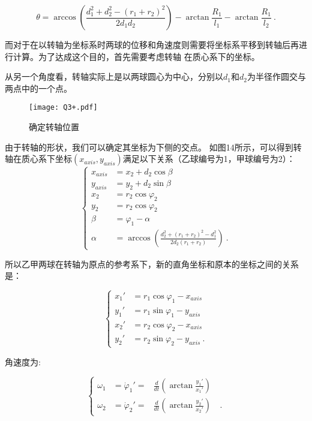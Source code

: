 \documentclass[a4paper,c5size,twoside,UTF8]{ctexart} %
\newcommand{\FS}[2]{\displaystyle\frac{#1}{#2}}
\numberwithin{equation}{section}   %
\begin{document}
\begin{equation}
	\theta= \arccos{\left(\FS{d_1^2+d_2^2-\left(r_1+r_2\right)^2}{2d_1d_2}\right)}-\arctan{\FS{R_1}{l_1}}-\arctan{\FS{R_1}{l_2}}~.
\end{equation}

而对于在以转轴为坐标系时两球的位移和角速度则需要将坐标系平移到转轴后再进行计算。为了达成这个目的，首先需要考虑转轴
在质心系下的坐标。

从另一个角度看，转轴实际上是以两球圆心为中心，分别以$d_1$和$d_2$为半径作圆交与两点中的一个点。


\begin{figure}[H]
	\centering
	\texttt{[image: Q3+.pdf]}
	\caption{确定转轴位置}
\end{figure}






由于转轴的形状，我们可以确定其坐标为下侧的交点。
如图14所示，可以得到转轴在质心系下坐标$(x_{axis},y_{axis})$满足以下关系（乙球编号为1，甲球编号为2）：
\begin{equation}
	\left\{\begin{aligned}
		x_{axis}&=x_2+d_2 \cos{\beta} \\
		y_{axis}&=y_2+d_2 \sin{\beta} \\
		x_2 &= r_2\cos{\varphi_2} \\
		y_2 &= r_2\cos{\varphi_2} \\
		\beta &=\varphi_1 - \alpha \\
		\alpha &= \arccos{\left( \FS{d_2^2+\left( r_1+r_2 \right)^2 -d_1^2}{2d_2\left( r_1+r_2 \right)} \right)} ~.
	\end{aligned}
	\right.
\end{equation}

所以乙甲两球在转轴为原点的参考系下，新的直角坐标和原本的坐标之间的关系是：

\begin{equation}
	\left\{\begin{aligned}
		x_1'&=r_1\cos{\varphi_1}-x_{axis} \\
		y_1'&=r_1\sin{\varphi_1}-y_{axis} \\
		x_2'&=r_2\cos{\varphi_2}-x_{axis} \\
		y_2'&=r_2\sin{\varphi_2}-y_{axis} ~.
		\end{aligned}
	\right.
\end{equation}

角速度为:

\begin{equation}
	\left\{\begin{aligned}
		\omega_1 & = \dot{\varphi}_1' =& \FS{d}{dt}\left(\arctan{\FS{y_1'}{x_1'}}\right)& \\
		\omega_2 & = \dot{\varphi}_2' =& \FS{d}{dt}\left(\arctan{\FS{y_2'}{x_2'}}\right)& ~.
		\end{aligned}
	\right.
\end{equation}
\end{document}
